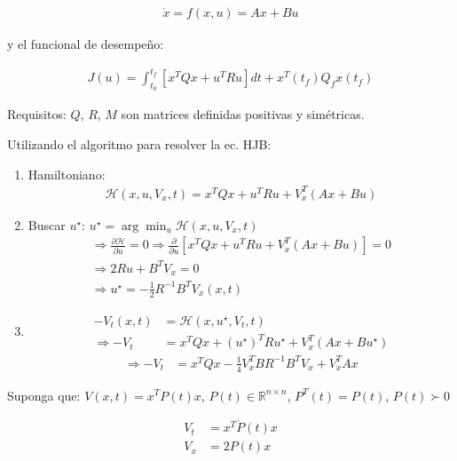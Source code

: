 \begin{align*}
    \dot{x} = f(x,u) = A x + B u
\end{align*}

y el funcional de desempeño:

\begin{align*}
    J(u) =\int_{t_0}^{t_f} \left[ x^T Q x + u^T R u \right] dt + x^T(t_f) Q_f x(t_f)
\end{align*}

Requisitos: $Q$, $R$, $M$ son matrices definidas positivas y simétricas.\\

\par Utilizando el algoritmo para resolver la ec. HJB:

\begin{enumerate}
    \item[1.] Hamiltoniano:
    \begin{align*}
        \mathcal{H}(x,u,V_x,t) = x^T Q x + u^T R u + V^T_x \left( A x + B u \right)
    \end{align*}
    \item[3.] Buscar $u^\star$: $u^\star = \arg \min_u \mathcal{H}(x,u,V_x,t)$
    \begin{align*}
        \Longrightarrow \frac{\partial \mathcal{H}}{\partial u} = 0 \Longrightarrow \frac{\partial}{\partial u}\left[ x^T Q x + u^T R u + V_x^T \left( A x + B u \right) \right] = 0\\
        \Longrightarrow 2 R u + B^T V_x = 0\\
        \Longrightarrow u^\star = -\frac{1}{2} R^{-1} B^T V_x(x,t)
    \end{align*}
    \item[2. y 4.] \begin{align*}
        -V_t(x,t) &= \mathcal{H}(x,u^\star,V_t,t)\\
        \Longrightarrow -V_t &= x^T Q x + (u^\star)^T R u^\star + V_x^T \left(A x + B u^\star\right)
    \end{align*} 
    \begin{align}
        \Longrightarrow -V_t &= x^T Q x - \frac{1}{4} V_x^T B R^{-1} B^T V_x + V_x^T A x
    \end{align}
\end{enumerate}

Suponga que: $V(x,t) = x^T P(t) x$, $P(t) \in \mathbb{R}^{n \times n}$, $P^T (t)=P(t)$, $P(t) \succ 0$

\begin{align*}
    V_t &= x^T \dot{P}(t) x\\
    V_x &= 2 P(t) x
\end{align*}

